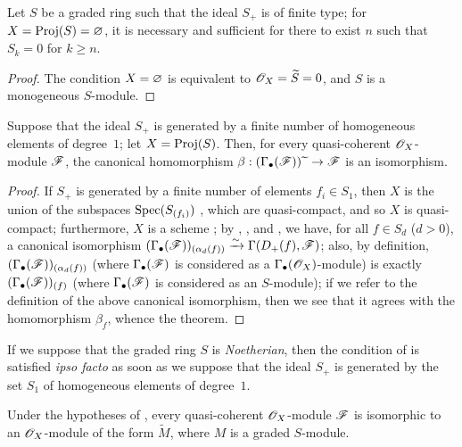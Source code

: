 \begin{corollary}[2.7.4]
\label{II.2.7.4}
Let $S$ be a graded ring such that the ideal $S_+$ is of finite type;
for $X=\operatorname{Proj}(S)=\varnothing$, it is necessary and sufficient for there to exist $n$ such that $S_k=0$ for $k\geq n$.
\end{corollary}

\begin{proof}
The condition $X=\varnothing$ is equivalent to $\mathscr{O}_X=\widetilde{S}=0$, and $S$ is a monogeneous $S$-module.
\end{proof}

\begin{theorem}[2.7.5]
\label{II.2.7.5}
Suppose that the ideal $S_+$ is generated by a finite number of homogeneous elements of degree~$1$;
let $X=\operatorname{Proj}(S)$.
Then, for every quasi-coherent $\mathscr{O}_X$-module $\mathscr{F}$, the canonical homomorphism $\beta:(\Gamma_\bullet(\sh{F}))\supertilde\to\sh{F}$  is an isomorphism.
\end{theorem}

\begin{proof}
If $S_+$ is generated by a finite number of elements $f_i\in S_1$, then $X$ is the union of the subspaces $\operatorname{Spec}(S_{(f_i)})$ , which are quasi-compact, and so $X$ is quasi-compact;
furthermore, $X$ is a scheme ;
by , , and , we have, for all $f\in S_d$ ($d>0$), a canonical isomorphism $(\Gamma_\bullet(\mathscr{F}))_{(\alpha_d(f))}\xrightarrow{\sim}\Gamma(D_+(f),\mathscr{F})$;
also, by definition, $(\Gamma_\bullet(\mathscr{F}))_{(\alpha_d(f))}$ (where $\Gamma_\bullet(\mathscr{F})$ is considered as a $\Gamma_\bullet(\mathscr{O}_X)$-module) is exactly $(\Gamma_\bullet(\mathscr{F}))_{(f)}$ (where $\Gamma_\bullet(\mathscr{F})$ is considered as an $S$-module);
if we refer to the definition  of the above canonical isomorphism, then we see that it agrees with the homomorphism $\beta_f$, whence the theorem.
\end{proof}

\begin{remark}[2.7.6]
\label{II.2.7.6}
If we suppose that the graded ring $S$ is \emph{Noetherian}, then the condition of  is satisfied \emph{ipso facto} as soon as we suppose that the ideal $S_+$ is generated by the set $S_1$ of homogeneous elements of degree~$1$.
\end{remark}

\begin{corollary}[2.7.7]
\label{II.2.7.7}
Under the hypotheses of , every quasi-coherent $\mathscr{O}_X$-module $\mathscr{F}$ is isomorphic to an $\mathscr{O}_X$-module of the form $\widetilde{M}$, where $M$ is a graded $S$-module.
\end{corollary}

